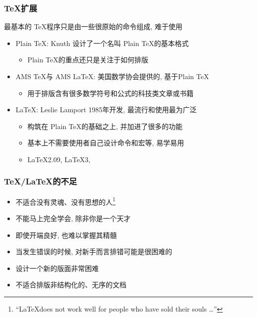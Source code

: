 \documentclass[compress]{beamer}
\begin{document}
\begin{frame}
\frametitle{\TeX{}扩展}
最基本的 \TeX 程序只是由一些很原始的命令组成, 难于使用
\begin{itemize}
\item Plain \TeX: Knuth 设计了一个名叫 Plain \TeX 的基本格式
    \begin{itemize}
      \item Plain \TeX 的重点还只是关注于如何排版
    \end{itemize}
\item AMS \TeX{}与 AMS \LaTeX: 美国数学协会提供的, 基于Plain \TeX
    \begin{itemize}
    \item 用于排版含有很多数学符号和公式的科技类文章或书籍
    \end{itemize}
\item \LaTeX: Leslie Lamport 1985年开发, 最流行和使用最为广泛
    \begin{itemize}
      \item 构筑在 Plain \TeX 的基础之上, 并加进了很多的功能
      \item 基本上不需要使用者自己设计命令和宏等, 易学易用
      \item \LaTeX{}2.09, \LaTeX{}3, \LaTeXe
    \end{itemize}

\end{itemize}
\end{frame}


\begin{frame}
\frametitle{\TeX{}/\LaTeX{}的不足}

\begin{itemize}
\item 不适合没有灵魂、没有思想的人\footnote{``\LaTeX does not work well for people who have sold their souls \ldots''}

\item 不能马上完全学会, 除非你是一个天才

\item 即使开端良好, 也难以掌握其精髓

\item 当发生错误的时候, 对新手而言排错可能是很困难的

\item 设计一个新的版面非常困难

\item 不适合排版非结构化的、无序的文档
\end{itemize}


\end{frame}
\end{document}
